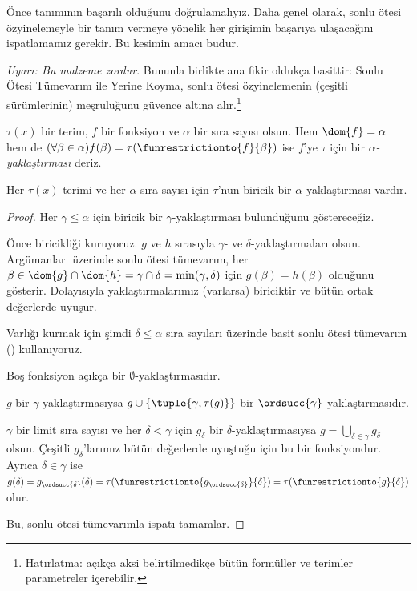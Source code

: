 


Önce  tanımının başarılı olduğunu
doğrulamalıyız. Daha genel olarak, sonlu ötesi özyinelemeyle bir tanım
vermeye yönelik her girişimin başarıya ulaşacağını ispatlamamız gerekir.
Bu kesimin amacı budur.

\emph{Uyarı: Bu malzeme zordur}. Bununla birlikte ana fikir oldukça
basittir: Sonlu Ötesi Tümevarım ile Yerine Koyma, sonlu ötesi özyinelemenin
(çeşitli sürümlerinin) meşruluğunu güvence altına alır.\footnote{Hatırlatma:
açıkça aksi belirtilmedikçe bütün formüller ve terimler parametreler
içerebilir.}

\begin{defn}
	$\tau(x)$ bir terim, $f$ bir fonksiyon ve $\alpha$ bir sıra sayısı olsun.
	Hem $\dom{f}=\alpha$ hem de
	$(\forall\beta\in\alpha)f(\beta)=
	\tau(\funrestrictionto{f}{\beta})$ ise $f$'ye $\tau$ için bir
	\emph{$\alpha$-yaklaştırması} deriz.
\end{defn}

\begin{lem}
Her $\tau(x)$ terimi ve her $\alpha$ sıra sayısı için $\tau$'nun biricik bir
$\alpha$-yaklaştırması vardır.
\end{lem}
\begin{proof}
Her $\gamma\leq\alpha$ için biricik bir $\gamma$-yaklaştırması bulunduğunu
göstereceğiz.

Önce biricikliği kuruyoruz. $g$ ve $h$ sırasıyla $\gamma$- ve
$\delta$-yaklaştırmaları olsun. Argümanları üzerinde sonlu ötesi tümevarım,
her $\beta\in\dom{g}\cap\dom{h}=\gamma\cap\delta=
\min(\gamma,\delta)$ için $g(\beta)=h(\beta)$ olduğunu gösterir. Dolayısıyla
yaklaştırmalarımız (varlarsa) biriciktir ve bütün ortak değerlerde uyuşur.

Varlığı kurmak için şimdi $\delta\leq\alpha$ sıra sayıları üzerinde basit
sonlu ötesi tümevarım ()
kullanıyoruz.

Boş fonksiyon açıkça bir $\emptyset$-yaklaştırmasıdır.

$g$ bir $\gamma$-yaklaştırmasıysa
$g\cup\{\tuple{\gamma,\tau(g)}\}$ bir
$\ordsucc{\gamma}$-yaklaştırmasıdır.

$\gamma$ bir limit sıra sayısı ve her $\delta<\gamma$ için $g_\delta$ bir
$\delta$-yaklaştırmasıysa
$g=\bigcup_{\delta\in\gamma}g_\delta$ olsun. Çeşitli $g_\delta$'larımız
bütün değerlerde uyuştuğu için bu bir fonksiyondur. Ayrıca
$\delta\in\gamma$ ise
$g(\delta)=g_{\ordsucc{\delta}}(\delta)=
\tau(\funrestrictionto{g_{\ordsucc{\delta}}}{\delta})=
\tau(\funrestrictionto{g}{\delta})$ olur.

Bu, sonlu ötesi tümevarımla ispatı tamamlar.
\end{proof}

